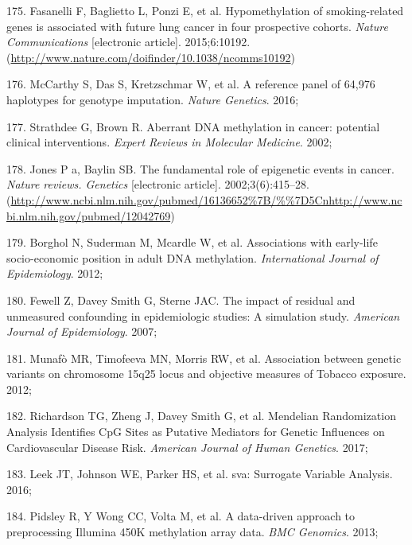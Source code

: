 \documentclass[11pt,oneside]{bristolthesis}
\newenvironment{cslreferences}%
  {}%
  {\par}
\begin{document}
\begin{cslreferences}
\leavevmode\hypertarget{ref-Fasanelli2015}{}%
175. Fasanelli F, Baglietto L, Ponzi E, et al. Hypomethylation of smoking-related genes is associated with future lung cancer in four prospective cohorts. \emph{Nature Communications} {[}electronic article{]}. 2015;6:10192. (\url{http://www.nature.com/doifinder/10.1038/ncomms10192})

\leavevmode\hypertarget{ref-McCarthy2016}{}%
176. McCarthy S, Das S, Kretzschmar W, et al. A reference panel of 64,976 haplotypes for genotype imputation. \emph{Nature Genetics}. 2016;

\leavevmode\hypertarget{ref-Strathdee2002}{}%
177. Strathdee G, Brown R. Aberrant DNA methylation in cancer: potential clinical interventions. \emph{Expert Reviews in Molecular Medicine}. 2002;

\leavevmode\hypertarget{ref-Jones2002}{}%
178. Jones P a, Baylin SB. The fundamental role of epigenetic events in cancer. \emph{Nature reviews. Genetics} {[}electronic article{]}. 2002;3(6):415--28. (\url{http://www.ncbi.nlm.nih.gov/pubmed/16136652\%7B/\%\%7D5Cnhttp://www.ncbi.nlm.nih.gov/pubmed/12042769})

\leavevmode\hypertarget{ref-Borghol2012}{}%
179. Borghol N, Suderman M, Mcardle W, et al. Associations with early-life socio-economic position in adult DNA methylation. \emph{International Journal of Epidemiology}. 2012;

\leavevmode\hypertarget{ref-Fewell2007}{}%
180. Fewell Z, Davey Smith G, Sterne JAC. The impact of residual and unmeasured confounding in epidemiologic studies: A simulation study. \emph{American Journal of Epidemiology}. 2007;

\leavevmode\hypertarget{ref-Munafo2012}{}%
181. Munafò MR, Timofeeva MN, Morris RW, et al. Association between genetic variants on chromosome 15q25 locus and objective measures of Tobacco exposure. 2012;

\leavevmode\hypertarget{ref-Richardson2017}{}%
182. Richardson TG, Zheng J, Davey Smith G, et al. Mendelian Randomization Analysis Identifies CpG Sites as Putative Mediators for Genetic Influences on Cardiovascular Disease Risk. \emph{American Journal of Human Genetics}. 2017;

\leavevmode\hypertarget{ref-Leek2016}{}%
183. Leek JT, Johnson WE, Parker HS, et al. sva: Surrogate Variable Analysis. 2016;

\leavevmode\hypertarget{ref-Pidsley2013}{}%
184. Pidsley R, Y Wong CC, Volta M, et al. A data-driven approach to preprocessing Illumina 450K methylation array data. \emph{BMC Genomics}. 2013;


\end{cslreferences}
\end{document}
